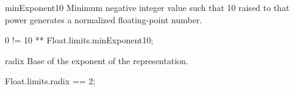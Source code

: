 \begin{urbiscriptapi}
\item[minExponent10]
  Minimum negative integer value such that 10 raised to that power
  generates a normalized floating-point number.
\begin{urbiassert}
0 != 10 ** Float.limits.minExponent10;
\end{urbiassert}


\item[radix]
  Base of the exponent of the representation.
\begin{urbiassert}
Float.limits.radix == 2;
\end{urbiassert}
\end{urbiscriptapi}

